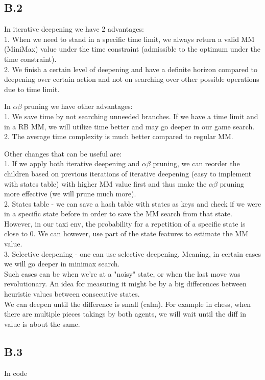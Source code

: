 \documentclass[12pt]{article}
\begin{document}
\subsection*{B.2}
In iterative deepening we have 2 advantages:\\
1. When we need to stand in a specific time limit, we always return a valid MM (MiniMax) value under the time constraint (admissible to the optimum under the time constraint).\\
2. We finish a certain level of deepening and have a definite horizon compared to deepening over certain action and not on searching over other possible operations due to time limit. 

In $\alpha\beta$ pruning we have other advantages:\\
1. We save time by not searching unneeded branches. If we have a time limit and in a RB MM, we will utilize time better and may go deeper in our game search.
2. The average time complexity is much better compared to regular MM.

Other changes that can be useful are:\\
1. If we apply both iterative deepening and $\alpha\beta$ pruning, we can reorder the children based on previous iterations of iterative deepening (easy to implement with states table) with higher MM value first and thus make the $\alpha\beta$ pruning more effective (we will prune much more).\\
2. States table - we can save a hash table with states as keys and check if we were in a specific state before in order to save the MM search from that state. However, in our taxi env, the probability for a repetition of a specific state is close to 0. We can however, use part of the state features to estimate the MM value.\\
3. Selective deepening - one can use selective deepening. Meaning, in certain cases we will go deeper in minimax search.\\
Such cases can be when we're at a "noisy" state, or when the last move was revolutionary. An idea for measuring it might be by a big differences between heuristic values between consecutive states.\\
We can deepen until the difference is small (calm). For example in chess, when there are multiple pieces takings by both agents, we will wait until the diff in value is about the same.

\subsection*{B.3}
In code 
\end{document}
